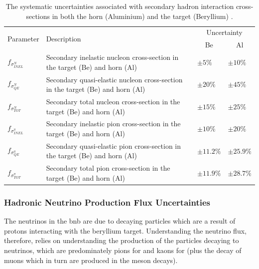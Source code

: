 \begin{table}[!h]
  \renewcommand{\arraystretch}{1.4}    
  \begin{tabular}{p{1.9cm} p{7.8cm} p{1.55cm} p{1.55cm}}
    \toprule
    \multirow{2}{*}{Parameter} & \multirow{2}{*}{Description} & \multicolumn{2}{c}{Uncertainty} \\
    && \multicolumn{1}{c}{Be} & \multicolumn{1}{c}{Al} \\
    \midrule

    $f_{\sigma_{INEL}^{N}}$   & Secondary inelastic nucleon cross-section in the target (Be) and horn (Al) & $\pm 5 \%$ & $\pm 10 \%$\\
                            
    $f_{\sigma_{QE}^{N}}$     & Secondary quasi-elastic nucleon cross-section in the target (Be) and horn (Al) & $\pm 20 \%$ & $\pm 45 \%$\\
                            
    $f_{\sigma_{TOT}^{N}}$    & Secondary total nucleon cross-section in the target (Be) and horn (Al) & $\pm 15 \%$ & $\pm 25 \%$\\

    $f_{\sigma_{INEL}^{\pi}}$ & Secondary inelastic pion cross-section in the target (Be) and horn (Al) & $\pm 10 \% $ & $\pm 20 \% $\\
                          
    $f_{\sigma_{QE}^{\pi}}$   & Secondary quasi-elastic pion cross-section in the target (Be) and horn (Al) & $\pm 11.2 \% $ & $\pm 25.9 \% $\\
                          
    $f_{\sigma_{TOT}^{\pi}}$  & Secondary total pion cross-section in the target (Be) and horn (Al) & $\pm 11.9 \%$ & $\pm 28.7 \%$\\
    \bottomrule
  \end{tabular}
  \caption[Hadronic secondary interaction flux systematic parameters.]{The systematic uncertainties associated with secondary hadron interaction cross-sections in both the horn (Aluminium) and the target (Beryllium) \cite{SBN_Proposal}.}
  \label{table:secondary_hadron_interaction_xsec}
\end{table}

\newpage
\subsubsection*{Hadronic Neutrino Production Flux Uncertainties}
The neutrinos in the \gls{bnb} are due to decaying particles which are a result of protons interacting with the beryllium target. Understanding the neutrino flux, therefore, relies on understanding the production of the particles decaying to neutrinos, which are predominately pions for \numu and kaons for \nue (plus the decay of muons which in turn are produced in the meson decays). 

